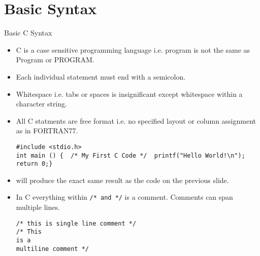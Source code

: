 \documentclass[10pt,t]{beamer}
\begin{document}
\section{Basic Syntax}
\begin{frame}{Basic C Syntax}
  \begin{itemize}
    \item C is a case sensitive programming language i.e. program is not the same as Program or PROGRAM.
    \item Each individual statement must end with a semicolon. 
    \item Whitespace i.e. tabs or spaces is insignificant except whitespace within a character string.
    \item All C statments are free format i.e. no specified layout or column assignment as in FORTRAN77.
      \begin{lstlisting}[basicstyle=\scriptsize\ttfamily]
#include <stdio.h>
int main () {  /* My First C Code */  printf("Hello World!\n");  return 0;}
      \end{lstlisting}
    \item[] will produce the exact same result as the code on the previous slide.
    \item In C everything within \lstinline|/* and */| is a comment. Comments can span multiple lines.
      \begin{lstlisting}
/* this is single line comment */
/* This
is a 
multiline comment */
      \end{lstlisting}
  \end{itemize}
\end{frame}
\end{document}
